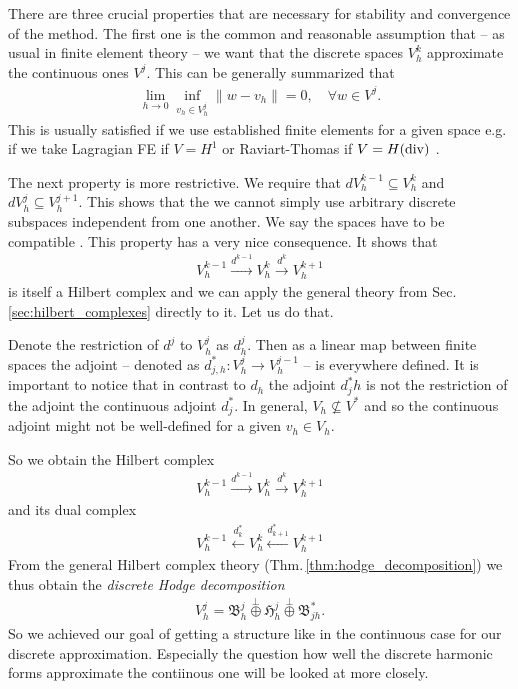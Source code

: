\documentclass[../master_thesis.tex]{subfiles}
\begin{document}
There are three crucial properties that are necessary for stability and convergence 
of the method. The first one is the common and reasonable assumption that 
-- as usual in finite element theory -- we want that the discrete spaces $V_h^k$
approximate the continuous ones $V^j$. This can be generally summarized that 
\begin{align*}
    \lim_{h \rightarrow 0} \inf_{v_h \in V_h^j} \lVert w - v_h \rVert = 0, \quad \forall w \in V^j.
\end{align*}
This is usually satisfied if we use established finite elements for a given space 
e.g. if we take Lagragian FE if $V = H^1$ or Raviart-Thomas if $V=H(\operatorname{div})$ \cite{}.

The next property is more restrictive. We require that $dV_h^{k-1} \subseteq V_h^k$ 
and $dV_h^j \subseteq V_h^{j+1}$. This shows that the we cannot simply use arbitrary 
discrete subspaces independent from one another. We say the spaces have to be 
compatible \cite{}. This property has a very nice
consequence. 
It shows that 
\begin{align*}
    V_h^{k-1} \xrightarrow{d^{k-1}} V_h^k \xrightarrow{d^k} V_h^{k+1}
\end{align*}
is itself a Hilbert complex and we can apply the general theory from 
Sec. \ref{sec:hilbert_complexes} directly to it. Let us do that.

Denote the restriction of $d^j$ to $V_h^j$ as $d_h^j$. Then as a linear map 
between finite spaces the adjoint -- denoted as $d_{j,h}^*: V_h^j \rightarrow V_h^{j-1}$ -- 
is everywhere defined. It is important to notice that in contrast to $d_h$ 
the adjoint $d^*_jh$ is not the restriction of the adjoint the continuous adjoint $d^*_j$.
In general, $V_h \not\subseteq V^*$ and so the continuous adjoint might not be 
well-defined for a given $v_h \in V_h$. 

So we obtain the Hilbert complex
\begin{align*}
    V_h^{k-1} \xrightarrow{d^{k-1}} V_h^{k} \xrightarrow{d^{k}} V_h^{k+1}
\end{align*}
and its dual complex
\begin{align*}
    V_h^{k-1} \xleftarrow{d^*_k} V_h^{k} \xleftarrow{d^*_{k+1}} V_h^{k+1}
\end{align*}
From the general Hilbert complex theory (Thm.\,\ref{thm:hodge_decomposition})
we thus obtain the \textit{discrete Hodge decomposition}
\begin{align*}
    V_h^j = \mathfrak{B}^j_h \stackrel{\perp}{\oplus} \mathfrak{H}^j_h \stackrel{\perp}{\oplus}
        \mathfrak{B}^*_{jh}.
\end{align*}
So we achieved our goal of getting a structure like in the continuous case 
for our discrete approximation. Especially the question how well the discrete harmonic 
forms approximate the contiinous one will be looked at more closely.
\end{document}

